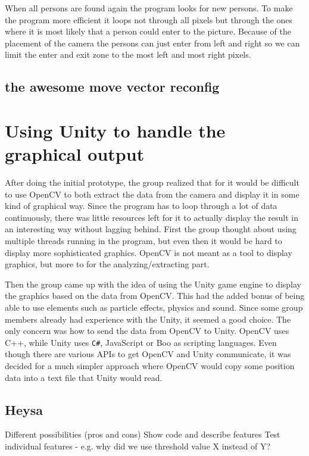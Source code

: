 When all persons are found again the program looks for new persons. To make the program more efficient it loops not through all pixels but through the ones where it is most likely that a person could enter to the picture. Because of the placement of the camera the persons can just enter from left and right so we can limit the enter and exit zone to the most left and most right pixels. 

\subsection{the awesome move vector reconfig}

\section{Using Unity to handle the graphical output}
After doing the initial prototype, the group realized that for it would be difficult to use OpenCV to both extract the data from the camera and display it in some kind of graphical way. Since the program has to loop through a lot of data continuously, there was little resources left for it to actually display the result in an interesting way without lagging behind. First the group thought about using multiple threads running in the program, but even then it would be hard to display more sophisticated graphics. OpenCV is not meant as a tool to display graphics, but more to for the analyzing/extracting part.

Then the group came up with the idea of using the Unity game engine to display the graphics based on the data from OpenCV. This had the added bonus of being able to use elements such as particle effects, physics and sound. Since some group members already had experience with the Unity, it seemed a good choice. The only concern was how to send the data from OpenCV to Unity. OpenCV uses C++, while Unity uses \texttt{C\#}, JavaScript or Boo as scripting languages. Even though there are various APIs to get OpenCV and Unity communicate, it was decided for a much simpler approach where OpenCV would copy some position data into a text file that Unity would read.

\subsection{Heysa}
Different possibilities (pros and cons)
Show code and describe features
Test individual features - e.g. why did we use threshold value X instead of Y?

